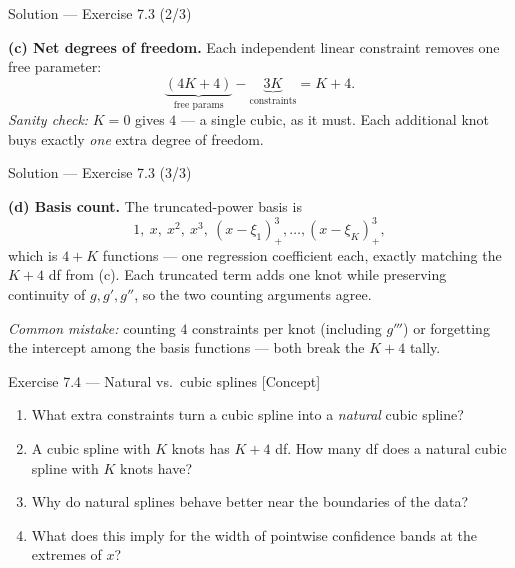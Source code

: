 \documentclass[aspectratio=169,11pt]{beamer}
\begin{document}
\begin{frame}{Solution --- Exercise 7.3 (2/3)}
\begin{solutionbox}
\textbf{(c) Net degrees of freedom.} Each independent linear constraint removes one free parameter:
\[ \underbrace{(4K+4)}_{\text{free params}}-\underbrace{3K}_{\text{constraints}} = K+4. \]
\emph{Sanity check:} $K=0$ gives $4$ --- a single cubic, as it must. Each additional knot buys exactly \emph{one} extra degree of freedom.
\end{solutionbox}
\end{frame}

\begin{frame}{Solution --- Exercise 7.3 (3/3)}
\begin{solutionbox}
\medskip
\textbf{(d) Basis count.} The truncated-power basis is
\[ 1,\ x,\ x^2,\ x^3,\ (x-\xi_1)^3_+,\dots,(x-\xi_K)^3_+, \]
which is $4+K$ functions --- one regression coefficient each, exactly matching the $K+4$ df from (c). Each truncated term adds one knot while preserving continuity of $g,g',g''$, so the two counting arguments agree.

\medskip
\textit{Common mistake:} counting $4$ constraints per knot (including $g'''$) or forgetting the intercept among the basis functions --- both break the $K+4$ tally.
\end{solutionbox}
\end{frame}


\begin{frame}{Exercise 7.4 --- Natural vs.\ cubic splines [Concept]}
\begin{exercise}
\begin{enumerate}
  \item What extra constraints turn a cubic spline into a \emph{natural} cubic spline?
  \item A cubic spline with $K$ knots has $K+4$ df. How many df does a natural cubic spline with $K$ knots have?
  \item Why do natural splines behave better near the boundaries of the data?
  \item What does this imply for the width of pointwise confidence bands at the extremes of $x$?
\end{enumerate}
\end{exercise}
\end{frame}
\end{document}
